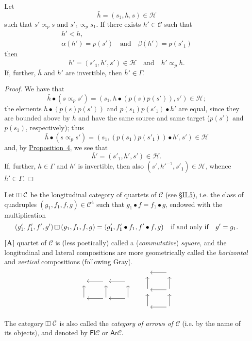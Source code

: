 \documentclass[a4paper,fleqn]{article}
\theoremstyle{plain}
\newenvironment{proposition}[1]
  {\renewcommand\theinnerproposition{#1}\innerproposition}
  {\endinnerproposition}
\theoremstyle{definition}
\newenvironment{longcomm}[1]
  {\noindent\textbf{[#1]}\rmfamily}
  {}
\newcommand{\oldpage}[1]{{\marginpar{\footnotesize$\bigg\vert$\,\,\,\,\textit{p.~#1}}}}
\newcommand{\textand}{\quad\text{and}\quad}
\newcommand{\CC}{\mathcal{C}}
\newcommand{\HH}{\mathcal{H}}
\newcommand{\subs}{\mathrel{\propto}}
\DeclareMathOperator{\vsq}{\raisebox{-.1em}{\rotatebox{90}{$\boxminus$}\,}}
\newcommand{\vmult}{\mathbin{\raisebox{-.1em}{\rotatebox{90}{$\boxminus$}}}}
\begin{document}
\begin{proposition}{7}
\label{proposition:i-7}
  Let
  \[
    \bar{h}
    = (s_1,h,s)
    \in\HH
  \]
  such that $s'\subs_p s$ and $s'_1\subs_p s_1$.
  If there exists $h'\in\CC$ such that
  \[
    \begin{gathered}
      h'<h,
    \\\alpha(h')=p(s')
      \textand
      \beta(h')=p(s'_1)
    \end{gathered}
  \]
  then
  \[
    \bar{h}'
    =(s'_1,h',s')
    \in\HH
    \textand
    \bar{h}'\subs_p\bar{h}.
  \]
  If, further, $\bar{h}$ and $h'$ are invertible, then $\bar{h}'\in\Gamma$.
\end{proposition}

\begin{proof}
  We have that
  \[
    \bar{h}\bullet(s\subs_p s')
    = (s_1,h\bullet(p(s)p(s')),s')
    \in\HH;
  \]
  the elements $h\bullet(p(s)p(s'))$ and $p(s_1)p(s'_1)\bullet h'$ are equal, since they are bounded above by $h$ and have the same source and same target ($p(s')$ and $p(s_1)$, respectively);
  thus
  \[
    \bar{h}\bullet(s\subs_p s')
    = (s_1,(p(s_1)p(s'_1))\bullet h',s')
    \in\HH
  \]
  and, by \hyperref[proposition:i-4]{Proposition~4}, we see that
  \[
    \bar{h}'
    = (s'_1,h',s')
    \in\HH.
  \]
  \oldpage{365}
  If, further, $\bar{h}\in\Gamma$ and $h'$ is invertible, then also $(s',h'^{-1},s'_1)\in\HH$, whence $\bar{h}'\in\Gamma$.
\end{proof}

Let $\vsq\CC$ be the longitudinal category of quartets of $\CC$ (see \hyperref[section:ii.5]{§II.5}), i.e. the class of quadruples $(g_1,f_1,f,g)\in\CC^4$ such that $g_1\bullet f=f_1\bullet g$, endowed with the multiplication
\[
  (g'_1,f'_1,f',g')\vmult(g_1,f_1,f,g)
  = (g'_1,f'_1\bullet f_1,f'\bullet f,g)
  \quad\text{if and only if}\quad
  g'=g_1.
\]

\begin{longcomm}{37.1}
  A quartet of $\CC$ is (less poetically) called a (\emph{commutative}) \emph{square}, and the longitudinal and lateral compositions are more geometrically called the \emph{horizontal} and \emph{vertical} compositions (following Gray).
  \[
    \begin{tikzcd}
      {}
      &{} \ar[l]
      &{} \ar[l]
    \\{} \ar[u]
      &{} \ar[l] \ar[u]
      &{} \ar[l] \ar[u]
    \end{tikzcd}
    \qquad
    \begin{tikzcd}
      {}
      & \ar[l]
    \\{} \ar[u]
      & \ar[l] \ar[u]
    \\{} \ar[u]
      & \ar[l] \ar[u]
    \end{tikzcd}
  \]

  The category $\vsq\CC$ is also called the \emph{category of arrows of $\CC$} (i.e. by the name of its objects), and denoted by $\mathsf{Fl}\CC$ or $\mathsf{Ar}\CC$.
\end{longcomm}
\end{document}

